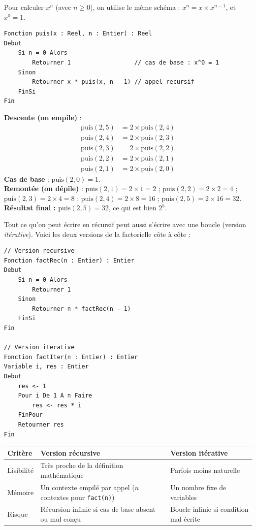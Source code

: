 \documentclass[11pt]{article}
\newcounter{popsec}
\newcounter{popsub}
\newcommand{\courssub}[1]{%
  \stepcounter{popsub}%
  \par\vspace{9pt}\noindent{\popxbold\fontsize{11.5}{13}\selectfont\color{popink}{\color{poporange}\thepopsec.\thepopsub}\hspace{6pt}#1}\par\nopagebreak\vspace{4pt}
}
\begin{document}
Pour calculer $x^n$ (avec $n \geq 0$), on utilise le même schéma : $x^n = x \times x^{n-1}$, et $x^0 = 1$.

\begin{lstlisting}
Fonction puis(x : Reel, n : Entier) : Reel
Debut
    Si n = 0 Alors
        Retourner 1                  // cas de base : x^0 = 1
    Sinon
        Retourner x * puis(x, n - 1) // appel recursif
    FinSi
Fin
\end{lstlisting}

\begin{exemplebox}
\textbf{Descente (on empile)} :
\begin{align*}
\text{puis}(2,5) &= 2 \times \text{puis}(2,4)\\
\text{puis}(2,4) &= 2 \times \text{puis}(2,3)\\
\text{puis}(2,3) &= 2 \times \text{puis}(2,2)\\
\text{puis}(2,2) &= 2 \times \text{puis}(2,1)\\
\text{puis}(2,1) &= 2 \times \text{puis}(2,0)
\end{align*}
\textbf{Cas de base} : $\text{puis}(2,0) = 1$.\\
\textbf{Remontée (on dépile)} : $\text{puis}(2,1) = 2 \times 1 = 2$ ; $\text{puis}(2,2) = 2 \times 2 = 4$ ; $\text{puis}(2,3) = 2 \times 4 = 8$ ; $\text{puis}(2,4) = 2 \times 8 = 16$ ; $\text{puis}(2,5) = 2 \times 16 = 32$.\\
\textbf{Résultat final : $\text{puis}(2,5) = 32$}, ce qui est bien $2^5$.
\end{exemplebox}

\courssub{Récursif ou itératif ?}

Tout ce qu'on peut écrire en récursif peut aussi s'écrire avec une boucle (version \emph{itérative}). Voici les deux versions de la factorielle côte à côte :

\begin{lstlisting}
// Version recursive
Fonction factRec(n : Entier) : Entier
Debut
    Si n = 0 Alors
        Retourner 1
    Sinon
        Retourner n * factRec(n - 1)
    FinSi
Fin

// Version iterative
Fonction factIter(n : Entier) : Entier
Variable i, res : Entier
Debut
    res <- 1
    Pour i De 1 A n Faire
        res <- res * i
    FinPour
    Retourner res
Fin
\end{lstlisting}

\begin{center}
\begin{tabularx}{\linewidth}{|l|X|X|}
\hline
\rowcolor{popblueL} \textbf{Critère} & \textbf{Version récursive} & \textbf{Version itérative} \\
\hline
Lisibilité & Très proche de la définition mathématique & Parfois moins naturelle \\
\hline
Mémoire & Un contexte empilé par appel ($n$ contextes pour \texttt{fact(n)}) & Un nombre fixe de variables \\
\hline
Risque & Récursion infinie si cas de base absent ou mal conçu & Boucle infinie si condition mal écrite \\
\hline
\end{tabularx}
\end{center}
\end{document}
